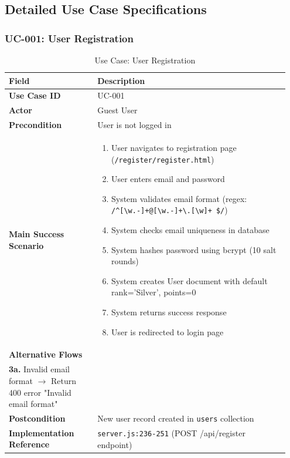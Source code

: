 \documentclass[12pt, a4paper]{report}
\begin{document}
\subsection{Detailed Use Case Specifications}

\subsubsection{UC-001: User Registration}

\begin{table}[H]
\centering
\caption{Use Case: User Registration}
\label{tab:uc_register}
\begin{tabular}{@{}p{0.30\linewidth}p{0.65\linewidth}@{}}
\toprule
\textbf{Field} & \textbf{Description} \\
\midrule
\textbf{Use Case ID} & UC-001 \\
\textbf{Actor} & Guest User \\
\textbf{Precondition} & User is not logged in \\
\textbf{Main Success Scenario} & 
\begin{minipage}[t]{\linewidth}
\begin{enumerate}[leftmargin=*, nosep]
    \item User navigates to registration page (\texttt{/register/register.html})
    \item User enters email and password
    \item System validates email format (regex: \texttt{/\^{}[\textbackslash w.-]+@[\textbackslash w.-]+\textbackslash .[\textbackslash w]+ \$/})
    \item System checks email uniqueness in database
    \item System hashes password using bcrypt (10 salt rounds)
    \item System creates User document with default rank='Silver', points=0
    \item System returns success response
    \item User is redirected to login page
\end{enumerate}
\end{minipage} \\
\textbf{Alternative Flows} & 
\begin{minipage}[t]{\linewidth}
\textbf{4a.} Email already exists $\rightarrow$ Return 400 error "Email already registered" \\
\textbf{3a.} Invalid email format $\rightarrow$ Return 400 error "Invalid email format"
\end{minipage} \\
\textbf{Postcondition} & New user record created in \texttt{users} collection \\
\textbf{Implementation Reference} & \texttt{server.js:236-251} (POST /api/register endpoint) \\
\bottomrule
\end{tabular}
\end{table}
\end{document}
